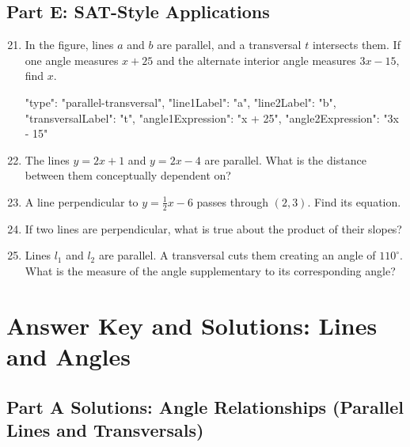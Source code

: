 \documentclass[14pt]{extarticle}
\begin{document}
\subsection*{Part E: SAT-Style Applications}
\begin{enumerate}
  \setcounter{enumi}{20}
  \item In the figure, lines \(a\) and \(b\) are parallel, and a transversal \(t\) intersects them. If one angle measures \(x + 25\) and the alternate interior angle measures \(3x - 15,\) find \(x.\)
  \begin{diagramdata}
  {
    "type": "parallel-transversal",
    "line1Label": "a",
    "line2Label": "b",
    "transversalLabel": "t",
    "angle1Expression": "x + 25",
    "angle2Expression": "3x - 15"
  }
  \end{diagramdata}
  \item The lines \(y = 2x + 1\) and \(y = 2x - 4\) are parallel. What is the distance between them conceptually dependent on?
  \item A line perpendicular to \(y = \tfrac{1}{2}x - 6\) passes through \((2, 3)\). Find its equation.
  \item If two lines are perpendicular, what is true about the product of their slopes?
  \item Lines \(l_1\) and \(l_2\) are parallel. A transversal cuts them creating an angle of \(110^\circ.\) What is the measure of the angle supplementary to its corresponding angle?
\end{enumerate}

\newpage


\section*{Answer Key and Solutions: Lines and Angles}

\subsection*{Part A Solutions: Angle Relationships (Parallel Lines and Transversals)}
\end{document}
